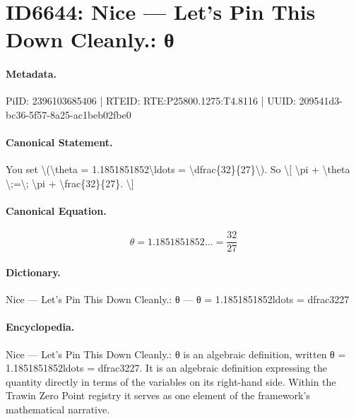 \section*{ID6644: Nice — Let’s Pin This Down Cleanly.: θ}
\paragraph{Metadata.}
PiID: 2396103685406 | RTEID: RTE:P25800.1275:T4.8116 | UUID: 209541d3-bc36-5f57-8a25-ac1beb02fbe0

\paragraph{Canonical Statement.}
You set \textbackslash{}(\textbackslash{}theta = 1.1851851852\textbackslash{}ldots = \textbackslash{}dfrac\{32\}\{27\}\textbackslash{}). So \textbackslash{}[ \textbackslash{}pi + \textbackslash{}theta \textbackslash{};=\textbackslash{}; \textbackslash{}pi + \textbackslash{}frac\{32\}\{27\}. \textbackslash{}]

\paragraph{Canonical Equation.}
\[
\theta = 1.1851851852\ldots = \dfrac{32}{27}
\]

\paragraph{Dictionary.}
Nice — Let’s Pin This Down Cleanly.: θ — θ = 1.1851851852ldots = dfrac3227

\paragraph{Encyclopedia.}
Nice — Let’s Pin This Down Cleanly.: θ is an algebraic definition, written θ = 1.1851851852ldots = dfrac3227. It is an algebraic definition expressing the quantity directly in terms of the variables on its right-hand side. Within the Trawin Zero Point registry it serves as one element of the framework's mathematical narrative.
